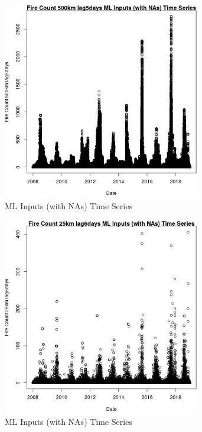 \begin{figure} 
\centering  
\includegraphics[width=0.77\textwidth]{Code_Outputs/Report_ML_input_PM25_Step4_part_f_de_duplicated_aveswNAs_Fire_Count_500km_lag5daysvDate.jpg} 
\caption{\label{fig:Report_ML_input_PM25_Step4_part_f_de_duplicated_aveswNAsFire_Count_500km_lag5daysvDate}ML Inputs (with NAs) Time Series} 
\end{figure} 
 

\begin{figure} 
\centering  
\includegraphics[width=0.77\textwidth]{Code_Outputs/Report_ML_input_PM25_Step4_part_f_de_duplicated_aveswNAs_Fire_Count_25km_lag6daysvDate.jpg} 
\caption{\label{fig:Report_ML_input_PM25_Step4_part_f_de_duplicated_aveswNAsFire_Count_25km_lag6daysvDate}ML Inputs (with NAs) Time Series} 
\end{figure} 
 

